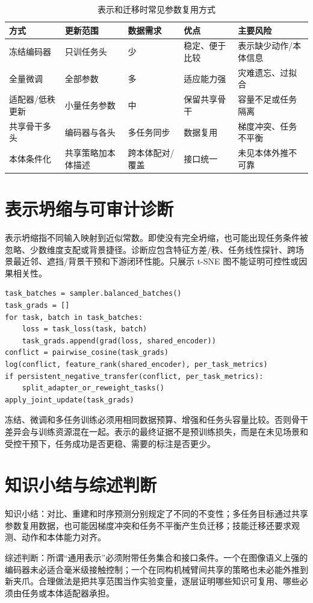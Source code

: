 \begin{table}[H]
\centering
\caption{表示和迁移时常见参数复用方式}
\label{tab:representation-transfer-strategies}
\begin{tabularx}{\textwidth}{>{\raggedright\arraybackslash}p{}YYYY}
\toprule
方式 & 更新范围 & 数据需求 & 优点 & 主要风险 \\
\midrule
冻结编码器 & 只训任务头 & 少 & 稳定、便于比较 & 表示缺少动作/本体信息 \\
全量微调 & 全部参数 & 多 & 适应能力强 & 灾难遗忘、过拟合 \\
适配器/低秩更新 & 小量任务参数 & 中 & 保留共享骨干 & 容量不足或任务隔离 \\
共享骨干多头 & 编码器与各头 & 多任务同步 & 数据复用 & 梯度冲突、任务不平衡 \\
本体条件化 & 共享策略加本体描述 & 跨本体配对/覆盖 & 接口统一 & 未见本体外推不可靠 \\
\bottomrule
\end{tabularx}
\end{table}

\section{表示坍缩与可审计诊断}

表示坍缩指不同输入映射到近似常数。即使没有完全坍缩，也可能出现任务条件被忽略、少数维度支配或背景捷径。诊断应包含特征方差/秩、任务线性探针、跨场景最近邻、遮挡/背景干预和下游闭环性能。只展示 t-SNE 图不能证明可控性或因果相关性。

\begin{lstlisting}[caption={多任务共享训练中的梯度冲突监控教学伪代码}]
task_batches = sampler.balanced_batches()
task_grads = []
for task, batch in task_batches:
    loss = task_loss(task, batch)
    task_grads.append(grad(loss, shared_encoder))
conflict = pairwise_cosine(task_grads)
log(conflict, feature_rank(shared_encoder), per_task_metrics)
if persistent_negative_transfer(conflict, per_task_metrics):
    split_adapter_or_reweight_tasks()
apply_joint_update(task_grads)
\end{lstlisting}

冻结、微调和多任务训练必须用相同数据预算、增强和任务头容量比较。否则骨干差异会与训练资源混在一起。表示的最终证据不是预训练损失，而是在未见场景和受控干预下，任务成功是否更稳、需要的标注是否更少。

\section{知识小结与综述判断}

知识小结：对比、重建和时序预测分别规定了不同的不变性；多任务目标通过共享参数复用数据，也可能因梯度冲突和任务不平衡产生负迁移；技能迁移还要求观测、动作和本体能力对齐。

综述判断：所谓“通用表示”必须附带任务集合和接口条件。一个在图像语义上强的编码器未必适合毫米级接触控制；一个在同构机械臂间共享的策略也未必能外推到新夹爪。合理做法是把共享范围当作实验变量，逐层证明哪些知识可复用、哪些必须由任务或本体适配器承担。
